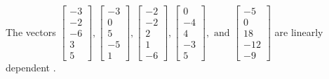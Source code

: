 \begin{exercise}
\begin{exerciseStatement}
  \end{exerciseStatement}
  \begin{exerciseAnswer}
   The vectors \(\left[\begin{array}{r}
-3 \\
-2 \\
-6 \\
3 \\
5
\end{array}\right] , \left[\begin{array}{r}
-3 \\
0 \\
5 \\
-5 \\
1
\end{array}\right] , \left[\begin{array}{r}
-2 \\
-2 \\
2 \\
1 \\
-6
\end{array}\right] , \left[\begin{array}{r}
0 \\
-4 \\
4 \\
-3 \\
5
\end{array}\right] , \text{ and } \left[\begin{array}{r}
-5 \\
0 \\
18 \\
-12 \\
-9
\end{array}\right]\) are 
  	 linearly dependent  .
  


  \end{exerciseAnswer}
\end{exercise}